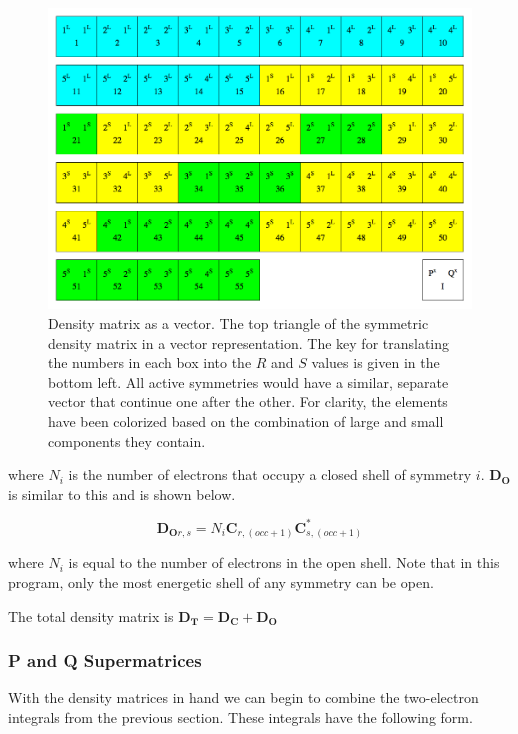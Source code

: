 \begin{figure}
\includegraphics[width=1\textwidth]{Figures/dtmx_vec.png}
\caption[Density matrix as a vector]
{Density matrix as a vector. The top triangle of the symmetric density matrix in a vector representation. The key for translating the numbers in each box into the $R$ and $S$ values is given in the bottom left. All active symmetries would have a similar, separate vector that continue one after the other. For clarity, the elements have been colorized based on the combination of large and small components they contain.}
\label{fig:dtmxvec}
\end{figure}


where $N_{i}$ is the number of electrons that occupy a closed shell of symmetry $i$. \textbf{D$_\textbf{O}$} is similar to this and is shown below.

\begin{equation}
\label{RDOMX}
\textbf{D$_{\textbf{O}r,s}$} =N_{i}\textbf{C}_{r,(occ+1)}\textbf{C}^{*}_{s,(occ+1)}
\end{equation}

where $N_{i}$ is equal to the number of electrons in the open shell. Note that in this program, only the most energetic shell of any symmetry can be open.

The total density matrix is $\textbf{D$_{\textbf{T}}$} =  \textbf{D$_{\textbf{C}}$} + \textbf{D$_{\textbf{O}}$}$

\subsubsection{P and Q Supermatrices}
\label{sec:PQmeth}
With the density matrices in hand we can begin to combine the two-electron integrals from the previous section. These integrals have the following form.\cite{MATSUOKA2001218}

